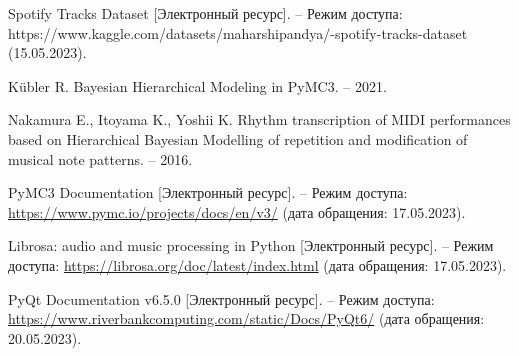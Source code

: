 
\begingroup
\renewcommand{\section}[2]{}
\begin{thebibliography}{}
	
Spotify Tracks Dataset [Электронный ресурс]. -- Режим доступа: https://www.kaggle.com/datasets/maharshipandya/-spotify-tracks-dataset (15.05.2023).

Kübler R. Bayesian Hierarchical Modeling in PyMC3. -- 2021.

Nakamura E., Itoyama K., Yoshii K. Rhythm transcription of MIDI performances based on Hierarchical Bayesian Modelling of repetition and modification of musical note patterns. -- 2016.

PyMC3 Documentation [Электронный ресурс]. -- Режим доступа: \url{https://www.pymc.io/projects/docs/en/v3/} (дата обращения: 17.05.2023).

Librosa: audio and music processing in Python [Электронный ресурс]. -- Режим доступа: \url{https://librosa.org/doc/latest/index.html} (дата обращения: 17.05.2023).

PyQt Documentation v6.5.0 [Электронный ресурс]. -- Режим доступа: \url{https://www.riverbankcomputing.com/static/Docs/PyQt6/} (дата обращения: 20.05.2023).

\end{thebibliography}
\endgroup